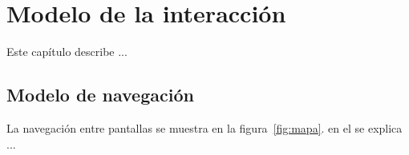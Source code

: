 \chapter{Modelo de la interacción}	
\label{cap:modInteraccion}

Este capítulo describe ...

\section{Modelo de navegación}

La navegación entre pantallas se muestra en la figura~\ref{fig:mapa}. en el se explica ...\\



\newpage


\newpage


\newpage


\newpage


\newpage


\newpage


\newpage


\newpage


\newpage


\newpage


\newpage


\newpage


\newpage

%

\newpage


\newpage


\newpage


\newpage


\newpage


\newpage


\newpage


\newpage


\newpage

